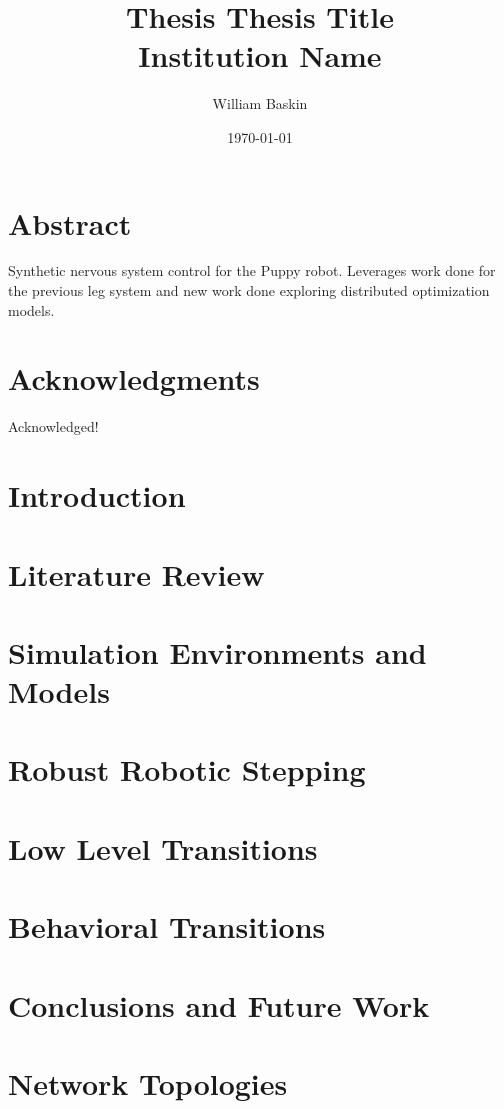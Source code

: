 \documentclass[12pt, letterpaper, oneside, onecolumn]{report}
\author{William Baskin}
\title{Thesis}
\title{
	{Thesis Title}\\
	{\large Institution Name}%
}
\date{\today}
\begin{document}
\maketitle


\tableofcontents

\listoffigures

\chapter*{Abstract}
Synthetic nervous system control for the Puppy robot. Leverages work done for the previous leg system and new work done exploring distributed optimization models.

\chapter*{Acknowledgments}
Acknowledged!

\chapter{Introduction}


\chapter{Literature Review}


\chapter{Simulation Environments and Models}


\chapter{Robust Robotic Stepping}


\chapter{Low Level Transitions}


\chapter{Behavioral Transitions}


\chapter{Conclusions and Future Work}


\appendix
\chapter{Network Topologies}


\printbibliography
\end{document}

